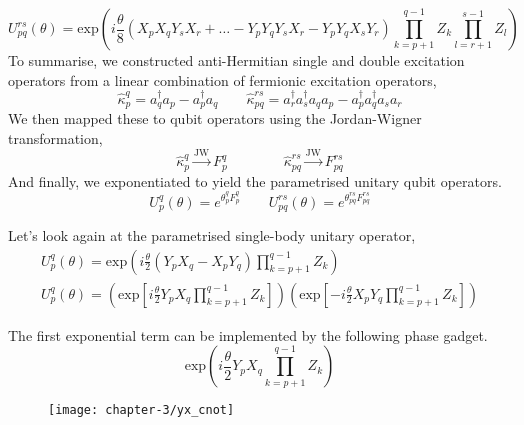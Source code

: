 \begin{equation*}
    U^{rs}_{pq} (\theta) = \text{exp} \left( i \frac{\theta}{8} (
    X_p X_q Y_s X_r
    + \dots -
    Y_p Y_q Y_s X_r -
    Y_p Y_q X_s Y_r )
    \prod_{k=p+1}^{q-1} Z_k
    \prod_{l=r+1}^{s-1} Z_l
    \right)
\end{equation*}
To summarise, we constructed anti-Hermitian single and double excitation operators from a linear combination of fermionic excitation operators,
\begin{equation*}
    \hat\kappa_p^q = a_q^\dagger a_p - a_p^\dagger a_q \qquad
    \hat\kappa_{pq}^{rs} =
    a_r^\dagger a_s^\dagger a_q a_p - a_p^\dagger a_q^\dagger a_s a_r
\end{equation*}\smallskip
We then mapped these to qubit operators using the Jordan-Wigner transformation,
\begin{equation*}
    \hat\kappa_p^q \xrightarrow{\text{JW}} F_p^q \qquad\qquad
    \hat\kappa_{pq}^{rs} \xrightarrow{\text{JW}} F_{pq}^{rs}
\end{equation*}
And finally, we exponentiated to yield the parametrised unitary qubit operators.
\begin{equation*}
    U^q_p (\theta) = e^{\theta^q_p F_p^q} \qquad
    U^{rs}_{pq}(\theta) = e^{\theta_{pq}^{rs} F_{pq}^{rs}}
\end{equation*}

Let's look again at the parametrised single-body unitary operator,
\begin{equation*}
\begin{gathered}
    U^q_p (\theta) =
    \text{exp} \left( i
    \frac{\theta}{2} (Y_p X_q - X_p Y_q) \prod_{k=p+1}^{q-1} Z_k \right) \\
    U^q_p (\theta) =
    \left( \text{exp} \left[
    i \frac{\theta}{2} Y_p X_q \prod_{k=p+1}^{q-1} Z_k \right] \right)
    \left( \text{exp} \left[ -
    i \frac{\theta}{2} X_p Y_q \prod_{k=p+1}^{q-1} Z_k \right] \right)
\end{gathered}
\end{equation*}

The first exponential term can be implemented by the following phase gadget.
\begin{equation*}
    \text{exp} \left( i
    \frac{\theta}{2} Y_p X_q \prod_{k=p+1}^{q-1} Z_k \right)
\end{equation*}

\begin{figure}[H]
\centering
\texttt{[image: chapter-3/yx\_cnot]}
\end{figure}

